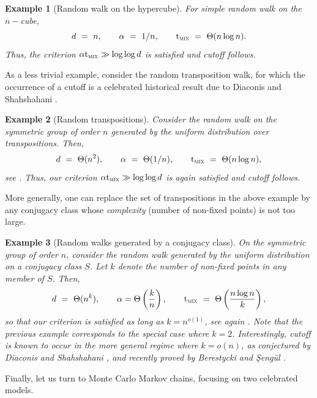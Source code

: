 \documentclass[12pt,final]{article}
\newtheorem{example}{Example}[section]
\numberwithin{equation}{section}
\newcommand{\tmix}{{\rm t}_{\textsc{mix}}}
\begin{document}
\begin{example}[Random walk on the hypercube]\label{ex:hypercube}For simple random walk on the $n-$cube, 
\begin{equation*}
d \ = \ n, \qquad \alpha\ =\ 1/n,\qquad \tmix \ =\ \Theta(n\log n).
\end{equation*}
Thus, the criterion $\alpha\tmix \gg {\log \log d}$ is satisfied and cutoff follows. 
\end{example}
As a less trivial example, consider the random transposition walk, for which the occurrence of a cutoff  is a celebrated historical result due to Diaconis and Shahshahani \cite{diaconis1981generating}.
\begin{example}[Random transpositions]\label{ex:transpositions}Consider the random walk on the symmetric group of order $n$ generated by the uniform distribution over transpositions. Then, 
\begin{equation*}
d \ = \ \Theta(n^2), \qquad \alpha\ =\ \Theta(1/n),\qquad \tmix \ =\ \Theta(n\log n),
\end{equation*}
see \cite{MR2023890,MR2094147}. Thus, our  criterion $\alpha\tmix \gg {\log \log d}$ is again satisfied and cutoff follows.  
\end{example}
More generally, one can replace the set of transpositions in the above example by any conjugacy class whose \emph{complexity} (number of non-fixed points) is not too large.
\begin{example}[Random walks generated by a conjugacy class]On the symmetric group of order $n$, consider the random walk generated by the uniform distribution on a conjugacy class $S$. Let  $k$ denote the number of non-fixed points in any member of $S$. Then, 
\begin{equation*}
d \ = \ \Theta(n^k), \qquad \alpha=\Theta\left(\frac{k}{n}\right),\qquad \tmix \ =\ \Theta\left(\frac{n\log n}{k}\right),
\end{equation*}
so that our criterion is satisfied as long as $k=n^{o(1)}$, see again \cite{MR2094147}.  Note that the previous example corresponds to the special case where $k=2$. Interestingly,  cutoff is known to occur in the more general regime where $k=o(n)$, as conjectured by   Diaconis and Shahshahani \cite{diaconis1981generating}, and recently proved by Berestycki and \c{S}eng\"{u}l  \cite{MR3936154}. 
\end{example}
Finally, let us turn to Monte Carlo Markov chains, focusing on two celebrated models.
\end{document}
